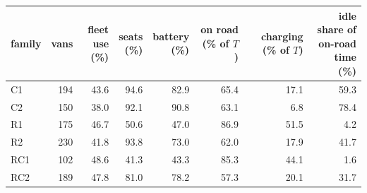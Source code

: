 \begin{tabular}{lrrrrrrr}\toprule
family & vans & \shortstack{fleet\\use (\%)} & \shortstack{seats\\(\%)} & \shortstack{battery\\(\%)} & \shortstack{on road\\(\% of $T$)} & \shortstack{charging\\(\% of $T$)} & \shortstack{idle share of\\on-road time (\%)} \\ \midrule
C1 & 194 & 43.6 & 94.6 & 82.9 & 65.4 & 17.1 & 59.3 \\
C2 & 150 & 38.0 & 92.1 & 90.8 & 63.1 & 6.8 & 78.4 \\
R1 & 175 & 46.7 & 50.6 & 47.0 & 86.9 & 51.5 & 4.2 \\
R2 & 230 & 41.8 & 93.8 & 73.0 & 62.0 & 17.9 & 41.7 \\
RC1 & 102 & 48.6 & 41.3 & 43.3 & 85.3 & 44.1 & 1.6 \\
RC2 & 189 & 47.8 & 81.0 & 78.2 & 57.3 & 20.1 & 31.7 \\
\bottomrule\end{tabular}

